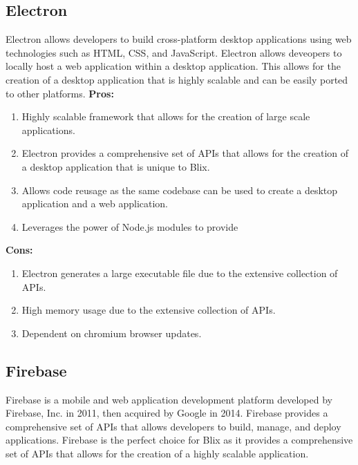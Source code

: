 \documentclass[11pt,a4paper]{article}
\begin{document}
\subsection{Electron}

Electron allows developers to build cross-platform desktop applications using web technologies such as HTML, CSS, and JavaScript.
Electron allows deveopers to locally host a web application within a desktop application. 
This allows for the creation of a desktop application that is highly scalable and can be easily ported to other platforms.
\textbf{Pros:}

\begin{enumerate}[label*=\arabic*.]
	\item[\textbullet] Highly scalable framework that allows for the creation of large scale applications.
	\item[\textbullet] Electron provides a comprehensive set of APIs that allows for the creation of a desktop application that is unique to Blix.
	\item[\textbullet] Allows code reusage as the same codebase can be used to create a desktop application and a web application.
	\item[\textbullet] Leverages the power of Node.js modules to provide 
\end{enumerate}

\textbf{Cons:}

\begin{enumerate}[label*=\arabic*.]
	\item[\textbullet] Electron generates a large executable file due to the extensive collection of APIs.
	\item[\textbullet] High memory usage due to the extensive collection of APIs.
	\item[\textbullet] Dependent on chromium browser updates.
\end{enumerate}


\subsection{Firebase}

Firebase is a mobile and web application development platform developed by Firebase, Inc. in 2011, then acquired by Google in 2014.
Firebase provides a comprehensive set of APIs that allows developers to build, manage, and deploy applications.
Firebase is the perfect choice for Blix as it provides a comprehensive set of APIs that allows for the creation of a highly scalable application.
\end{document}
